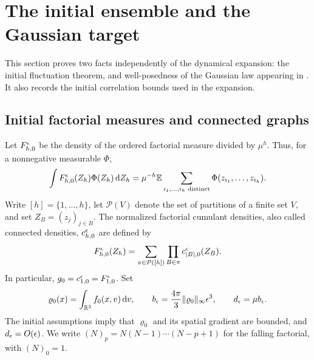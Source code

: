 \section{The initial ensemble and the Gaussian target}\label{sec:initial-target}

This section proves two facts independently of the dynamical expansion:
the initial fluctuation theorem, and well-posedness of the Gaussian law
appearing in .  It also records the initial correlation
bounds used in the expansion.

\subsection{Initial factorial measures and connected graphs}

Let $F_{h,0}^{\epsilon}$ be the density of the ordered factorial measure
divided by $\mu^h$.  Thus, for a nonnegative measurable $\Phi$,
\begin{equation}\label{eq:initial-factorial-definition}
 \int F_{h,0}^{\epsilon}(Z_h)\Phi(Z_h)\,\mathrm d Z_h
 =\mu^{-h}\mathbb E\sum_{i_1,\ldots,i_h\text{ distinct}}
       \Phi(z_{i_1},\ldots,z_{i_h}).
\end{equation}
Write $[h]=\{1,\ldots,h\}$, let $\mathcal P(V)$ denote the set of
partitions of a finite set $V$, and set $Z_B=(z_j)_{j\in B}$.
The normalized factorial cumulant densities, also called connected
densities, $c_{h,0}^{\epsilon}$ are defined by
\begin{equation}\label{eq:initial-partition-definition}
 F_{h,0}^{\epsilon}(Z_h)
   =\sum_{\pi\in\mathcal P([h])}
       \prod_{B\in\pi}c_{|B|,0}^{\epsilon}(Z_B).
\end{equation}
In particular, $g_0=c_{1,0}^{\epsilon}=F_{1,0}^{\epsilon}$.
Set
\[
 \varrho_0(x)=\int_{\mathbb R^3}f_0(x,v)\,\mathrm d v,
 \qquad b_\epsilon=\frac{4\pi}{3}\|\varrho_0\|_\infty\epsilon^3,
 \qquad d_\epsilon=\mu b_\epsilon.
\]
The initial assumptions imply that $\varrho_0$ and its spatial gradient
are bounded, and $d_\epsilon=O(\epsilon)$.
We write $(N)_p=N(N-1)\cdots(N-p+1)$ for the falling factorial,
with $(N)_0=1$.

